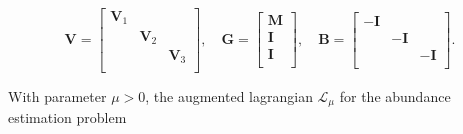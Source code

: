 $$
\mathbf{V} = \begin{bmatrix}
\mathbf{V}_1 &  &   \\
 &\mathbf{V}_2&   \\
  &  & \mathbf{V}_3 \\
\end{bmatrix},
\quad
\mathbf{G} = 
\begin{bmatrix}
\mathbf{M}\\ 
\mathbf{I}\\ 
\mathbf{I}\\ 
\end{bmatrix},
\quad
\mathbf{B} = 
\begin{bmatrix}
-\mathbf{I} &  &  \\
  &-\mathbf{I}&  \\
&  & -\mathbf{I} \\
\end{bmatrix}.
$$

With parameter $\mu > 0$, the augmented lagrangian $\mathcal{L}_\mu$ for the abundance estimation problem 
